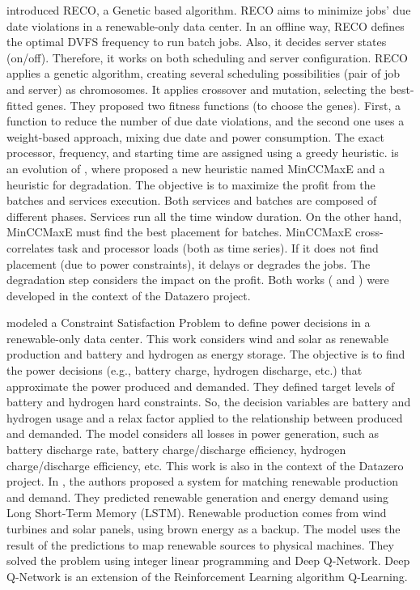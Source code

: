\citeauthor{caux2018optimization} \cite{caux2018optimization} introduced RECO, a Genetic based algorithm. RECO aims to minimize jobs' due date violations in a renewable-only data center. In an offline way, RECO defines the optimal DVFS frequency to run batch jobs. Also, it decides server states (on/off). Therefore, it works on both scheduling and server configuration. RECO applies a genetic algorithm, creating several scheduling possibilities (pair of job and server) as chromosomes. It applies crossover and mutation, selecting the best-fitted genes. They proposed two fitness functions (to choose the genes). First, a function to reduce the number of due date violations, and the second one uses a weight-based approach, mixing due date and power consumption. The exact processor, frequency, and starting time are assigned using a greedy heuristic. \cite{caux2019phase} is an evolution of \cite{caux2018optimization}, where \citeauthor{caux2019phase}  proposed a new heuristic named MinCCMaxE and a heuristic for degradation. The objective is to maximize the profit from the batches and services execution. Both services and batches are composed of different phases. Services run all the time window duration. On the other hand, MinCCMaxE must find the best placement for batches. MinCCMaxE cross-correlates task and processor loads (both as time series). If it does not find placement (due to power constraints), it delays or degrades the jobs. The degradation step considers the impact on the profit. Both works (\cite{caux2018optimization} and \cite{caux2019phase}) were developed in the context of the Datazero project.

\citeauthor{haddad2019mixed} \cite{haddad2019mixed} modeled a Constraint Satisfaction Problem to define power decisions in a renewable-only data center. This work considers wind and solar as renewable production and battery and hydrogen as energy storage. The objective is to find the power decisions (e.g., battery charge, hydrogen discharge, etc.) that approximate the power produced and demanded. They defined target levels of battery and hydrogen hard constraints. So, the decision variables are battery and hydrogen usage and a relax factor applied to the relationship between produced and demanded. The model considers all losses in power generation, such as battery discharge rate, battery charge/discharge efficiency, hydrogen charge/discharge efficiency, etc. This work is also in the context of the Datazero project. In \cite{gao2020smartly}, the authors proposed a system for matching renewable production and demand. They predicted renewable generation and energy demand using Long Short-Term Memory (LSTM). Renewable production comes from wind turbines and solar panels, using brown energy as a backup. The model uses the result of the predictions to map renewable sources to physical machines. They solved the problem using integer linear programming and Deep Q-Network. Deep Q-Network is an extension of the Reinforcement Learning algorithm Q-Learning. 

